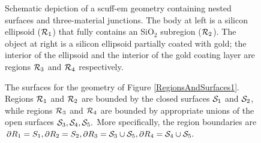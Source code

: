 \documentclass[letterpaper]{article}
\begin{document}
\begin{figure}
\begin{center}
\caption{Schematic depiction of a {\sc scuff-em} geometry containing
         nested surfaces and three-material junctions.
         The body at left is a silicon ellipsoid ($\mathcal{R}_1$)
         that fully contains an SiO$_2$ subregion ($\mathcal{R}_2$).
         The object at right is a silicon ellipsoid partially
         coated with gold; the interior of the ellipsoid and 
         the interior of the gold coating layer are regions 
         $\mathcal{R}_3$ and $\mathcal{R}_4$ respectively.
         }
\label{RegionsAndSurfaces1}
\vspace{1in}
\caption{The surfaces for the geometry of 
         Figure \ref{RegionsAndSurfaces1}. Regions $\mathcal{R}_1$
         and $\mathcal{R}_2$ are bounded by the closed surfaces
         $\mathcal{S}_1$ and $\mathcal{S}_2$, while regions $\mathcal{R}_3$ and
         $\mathcal{R}_4$ are bounded by appropriate unions of the 
         open surfaces $\mathcal{S}_3, \mathcal{S}_4, \mathcal{S}_5.$
         More specifically, the region boundaries are 
         $ \partial R_1=S_1,
            \partial R_2=S_2,
            \partial R_3=\mathcal{S}_3 \cup \mathcal{S}_5, 
            \partial R_4=\mathcal{S}_4 \cup \mathcal{S}_5.
         $
         }
\label{RegionsAndSurfaces2}
\end{center}
\end{figure}
\end{document}
